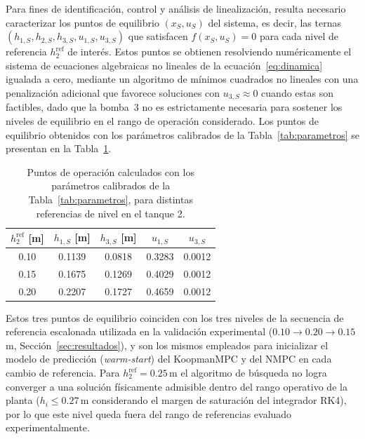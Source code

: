 \documentclass[12pt,letterpaper]{article}
\begin{document}
Para fines de identificación, control y análisis de linealización, resulta necesario
caracterizar los puntos de equilibrio $(x_S, u_S)$ del sistema, es decir, las
ternas $(h_{1,S}, h_{2,S}, h_{3,S}, u_{1,S}, u_{3,S})$ que satisfacen
$f(x_S,u_S)=0$ para cada nivel de referencia $h_2^{\mathrm{ref}}$ de interés. Estos
puntos se obtienen resolviendo numéricamente el sistema de ecuaciones algebraicas no
lineales de la ecuación~\eqref{eq:dinamica} igualada a cero, mediante un algoritmo de
mínimos cuadrados no lineales con una penalización adicional que favorece soluciones
con $u_{3,S}\approx0$ cuando estas son factibles, dado que la bomba~3 no es
estrictamente necesaria para sostener los niveles de equilibrio en el rango de
operación considerado. Los puntos de equilibrio obtenidos con los parámetros
calibrados de la Tabla~\ref{tab:parametros} se presentan en la
Tabla~\ref{tab:puntos_operacion}.

\begin{table}[ht]
\centering
\caption{Puntos de operación calculados con los parámetros calibrados de la
Tabla~\ref{tab:parametros}, para distintas referencias de nivel en el tanque 2.}
\label{tab:puntos_operacion}
\begin{tabular}{ccccc}
\toprule
$h_2^{\mathrm{ref}}$ [m] & $h_{1,S}$ [m] & $h_{3,S}$ [m] & $u_{1,S}$ & $u_{3,S}$ \\
\midrule
0.10 & 0.1139 & 0.0818 & 0.3283 & 0.0012 \\
0.15 & 0.1675 & 0.1269 & 0.4029 & 0.0012 \\
0.20 & 0.2207 & 0.1727 & 0.4659 & 0.0012 \\
\bottomrule
\end{tabular}
\end{table}

Estos tres puntos de equilibrio coinciden con los tres niveles de la secuencia de
referencia escalonada utilizada en la validación experimental
($0.10 \rightarrow 0.20 \rightarrow 0.15$\,m, Sección~\ref{sec:resultados}), y son los
mismos empleados para inicializar el modelo de predicción (\textit{warm-start}) del
KoopmanMPC y del NMPC en cada cambio de referencia. Para $h_2^{\mathrm{ref}}=0.25$\,m
el algoritmo de búsqueda no logra converger a una solución físicamente admisible
dentro del rango operativo de la planta ($h_i \le 0.27$\,m considerando el margen de
saturación del integrador RK4), por lo que este nivel queda fuera del rango de
referencias evaluado experimentalmente.


\end{document}
